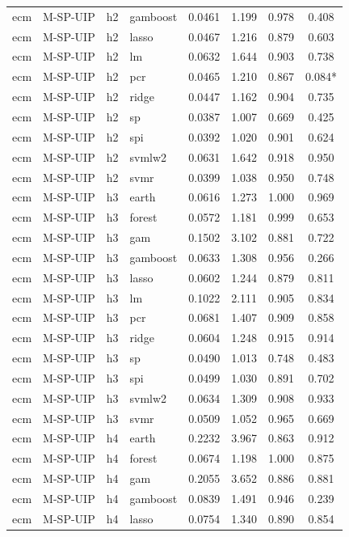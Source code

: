 \begin{ThreePartTable}
\begin{longtable}[t]{llclcccc}
ecm & M-SP-UIP & h2 & gamboost & 0.0461 & 1.199 & 0.978 & 0.408\\
ecm & M-SP-UIP & h2 & lasso & 0.0467 & 1.216 & 0.879 & 0.603\\
ecm & M-SP-UIP & h2 & lm & 0.0632 & 1.644 & 0.903 & 0.738\\
ecm & M-SP-UIP & h2 & pcr & 0.0465 & 1.210 & 0.867 & 0.084*\\
ecm & M-SP-UIP & h2 & ridge & 0.0447 & 1.162 & 0.904 & 0.735\\
ecm & M-SP-UIP & h2 & sp & 0.0387 & 1.007 & 0.669 & 0.425\\
ecm & M-SP-UIP & h2 & spi & 0.0392 & 1.020 & 0.901 & 0.624\\
ecm & M-SP-UIP & h2 & svmlw2 & 0.0631 & 1.642 & 0.918 & 0.950\\
ecm & M-SP-UIP & h2 & svmr & 0.0399 & 1.038 & 0.950 & 0.748\\
\addlinespace
ecm & M-SP-UIP & h3 & earth & 0.0616 & 1.273 & 1.000 & 0.969\\
ecm & M-SP-UIP & h3 & forest & 0.0572 & 1.181 & 0.999 & 0.653\\
ecm & M-SP-UIP & h3 & gam & 0.1502 & 3.102 & 0.881 & 0.722\\
ecm & M-SP-UIP & h3 & gamboost & 0.0633 & 1.308 & 0.956 & 0.266\\
ecm & M-SP-UIP & h3 & lasso & 0.0602 & 1.244 & 0.879 & 0.811\\
ecm & M-SP-UIP & h3 & lm & 0.1022 & 2.111 & 0.905 & 0.834\\
ecm & M-SP-UIP & h3 & pcr & 0.0681 & 1.407 & 0.909 & 0.858\\
ecm & M-SP-UIP & h3 & ridge & 0.0604 & 1.248 & 0.915 & 0.914\\
ecm & M-SP-UIP & h3 & sp & 0.0490 & 1.013 & 0.748 & 0.483\\
ecm & M-SP-UIP & h3 & spi & 0.0499 & 1.030 & 0.891 & 0.702\\
ecm & M-SP-UIP & h3 & svmlw2 & 0.0634 & 1.309 & 0.908 & 0.933\\
ecm & M-SP-UIP & h3 & svmr & 0.0509 & 1.052 & 0.965 & 0.669\\
\addlinespace
ecm & M-SP-UIP & h4 & earth & 0.2232 & 3.967 & 0.863 & 0.912\\
ecm & M-SP-UIP & h4 & forest & 0.0674 & 1.198 & 1.000 & 0.875\\
ecm & M-SP-UIP & h4 & gam & 0.2055 & 3.652 & 0.886 & 0.881\\
ecm & M-SP-UIP & h4 & gamboost & 0.0839 & 1.491 & 0.946 & 0.239\\
ecm & M-SP-UIP & h4 & lasso & 0.0754 & 1.340 & 0.890 & 0.854\\

\end{longtable}
\end{ThreePartTable}
